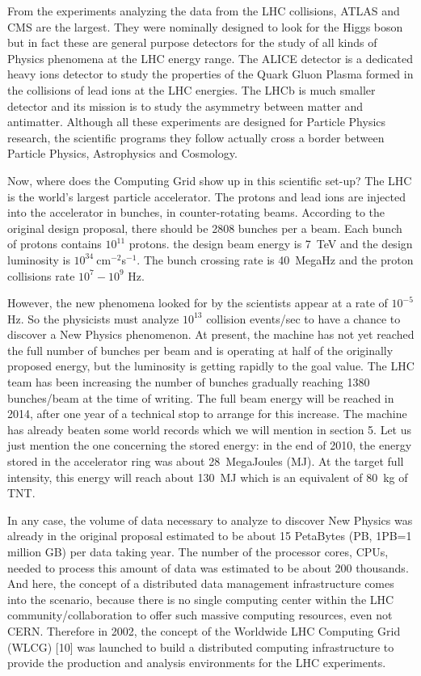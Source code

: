 From the experiments analyzing the data from the LHC
collisions, ATLAS and CMS are the largest. They were nominally
designed to look for the Higgs boson but in fact these are general
purpose detectors for the study of all kinds of Physics phenomena at
the LHC  energy range. The
ALICE  detector is a dedicated heavy ions detector to study the
properties of the Quark Gluon Plasma formed in the collisions of
lead ions  at the LHC energies. The LHCb is much smaller detector and its
mission is to study the asymmetry between matter and antimatter. 
Although all these experiments are
designed for Particle Physics research, the scientific programs they
follow actually cross a border between Particle Physics,
Astrophysics and Cosmology.

Now, where does the Computing Grid show up in this scientific set-up?
The LHC is the world's largest particle accelerator. The protons and
lead ions are injected into the accelerator in bunches, in
counter-rotating beams. According to the original design proposal,
there should be 2808 bunches per a beam. Each bunch of protons
contains $10^{11}$ protons. the design beam energy is 7~TeV and the
design luminosity is $10^{34}\ $cm${}^{-2}$s${}^{-1}$. The bunch
crossing rate is 40~MegaHz and the proton collisions rate
$10^7-10^9$ Hz.

However, the new phenomena looked for by the scientists appear at a
rate of $10^{-5}$ Hz. So the physicists must analyze $10^{13}$
collision events/sec to have a chance to discover a New Physics
phenomenon. At present, the machine has not yet reached the full
number of bunches per beam and is operating at half of the
originally proposed energy, but the luminosity is getting rapidly to
the goal value. The LHC team has been increasing the number of
bunches gradually reaching 1380 bunches/beam at the time of writing.
The full beam energy will be reached in 2014, after one year of a
technical stop to arrange for this increase. The machine has already
beaten some world records which we will mention in section 5. Let us
just mention the one concerning the stored energy: in the end of
2010, the energy stored in the accelerator ring was about 28~MegaJoules (MJ).
At the target full intensity, this energy will
reach about 130~MJ which is an equivalent of 80~kg of TNT.

In any case, the volume of data necessary to analyze to discover New
Physics was already in the original proposal estimated to be about
15 PetaBytes (PB, 1PB=1 million GB) per data taking year. The number 
of the processor cores, CPUs, needed to process this
amount of data was estimated to be about 200 thousands. And here,
the concept of a distributed data management infrastructure comes
into the scenario, because there is no single computing
center within the LHC community/collaboration to offer such  massive
computing resources, even not CERN. Therefore in 2002, the concept
of the Worldwide LHC Computing Grid (WLCG) [10] was launched to
build a distributed computing infrastructure to provide the
production and analysis environments for the LHC experiments.

